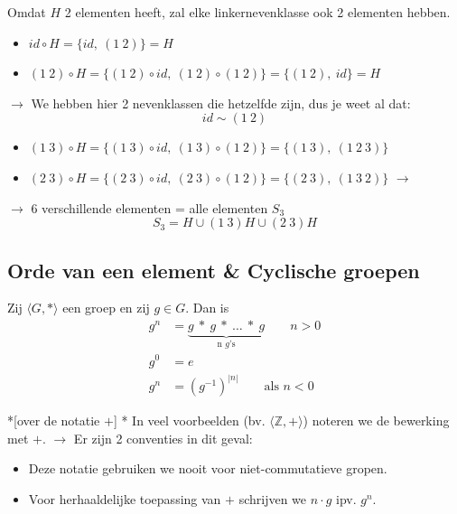  Omdat $H$ 2 elementen heeft, zal elke linkernevenklasse ook 2 elementen hebben.
\begin{itemize}
    \item $id \circ H = \{id,\ (1\ 2)\} = H$
    \item $(1\ 2) \circ H = \{(1\ 2) \circ id,\ (1\ 2) \circ (1\ 2)\} = \{(1\ 2),\ id\} = H$
\end{itemize}
$\rightarrow$ We hebben hier 2 nevenklassen die hetzelfde zijn, dus je weet al dat:
\begin{equation*}
    id \sim (1\ 2)
\end{equation*}
\begin{itemize}
    \item $(1\ 3) \circ H = \{(1\ 3) \circ id,\ (1\ 3)\circ(1\ 2)\} = \{(1\ 3),\ (1\ 2\ 3)\}$
    \item $(2\ 3) \circ H = \{(2\ 3) \circ id,\ (2\ 3)\circ(1\ 2)\} = \{(2\ 3),\ (1\ 3\ 2)\}$ $\rightarrow$
\end{itemize}
$\rightarrow$ 6 verschillende elementen = alle elementen $S_3$
\begin{equation*}
    S_3 = H \cup (1\ 3)H \cup (2\ 3)H
\end{equation*}




\newpage
\subsection{Orde van een element \& Cyclische groepen}

\textbf{} Zij $\langle G,* \rangle$ een groep en zij $g \in G$. Dan is
\begin{equation*}
    \begin{aligned}
        g^n &= \underbrace{g\ *\ g\ *\ \ldots\ *\ g}_{\text{n }g\text{'s}} \qquad n > 0 \\
        g^0 &= e \\
        g^n &= (g^{-1})^{|n|} \qquad \text{als } n<0
    \end{aligned}
\end{equation*}

\begin{nicenote}*[over de notatie $+$]
    \nextpart[]*
    In veel voorbeelden (bv. $\langle \mathbb{Z},+ \rangle$) noteren we de bewerking met $+$.\newline
    $\longrightarrow$ Er zijn 2 conventies in dit geval:
    \begin{itemize}
        \item Deze notatie gebruiken we nooit voor niet-commutatieve gropen.
        \item Voor herhaaldelijke toepassing van $+$ schrijven we $n \cdot g$ ipv. $g^n$.
    \end{itemize}
\end{nicenote}

